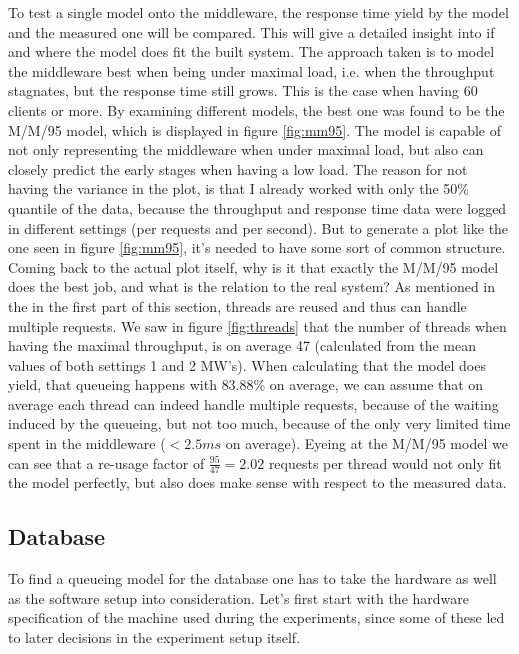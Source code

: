 \documentclass[11pt]{article}
\begin{document}
To test a single model onto the middleware, the response time yield by the model and the measured one will be compared. This will give a detailed insight into if and where the model does fit the built system. The approach taken is to model the middleware best when being under maximal load, i.e. when the throughput stagnates, but the response time still grows. This is the case when having 60 clients or more. By examining different models, the best one was found to be the M/M/95 model, which is displayed in figure \ref{fig:mm95}. The model is capable of not only representing the middleware when under maximal load, but also can closely predict the early stages when having a low load. The reason for not having the variance in the plot, is that I already worked with only the 50\% quantile of the data, because the throughput and response time data were logged in different settings (per requests and per second). But to generate a plot like the one seen in figure \ref{fig:mm95}, it's needed to have some sort of common structure. Coming back to the actual plot itself, why is it that exactly the M/M/95 model does the best job, and what is the relation to the real system? As mentioned in the in the first part of this section, threads are reused and thus can handle multiple requests. We saw in figure \ref{fig:threads} that the number of threads when having the maximal throughput, is on average 47 (calculated from the mean values of both settings 1 and 2 MW's). When calculating that the model does yield, that queueing happens with $83.88\%$ on average, we can assume that on average each thread can indeed handle multiple requests, because of the waiting induced by the queueing, but not too much, because of the only very limited time spent in the middleware ($<2.5ms$ on average). Eyeing at the M/M/95 model we can see that a re-usage factor of $\frac{95}{47}=2.02$ requests per thread would not only fit the model perfectly, but also does make sense with respect to the measured data.

\subsection{Database}\label{sec:db}
To find a queueing model for the database one has to take the hardware as well as the software setup into consideration. Let's first start with the hardware specification of the machine used during the experiments, since some of these led to later decisions in the experiment setup itself.
\end{document}

